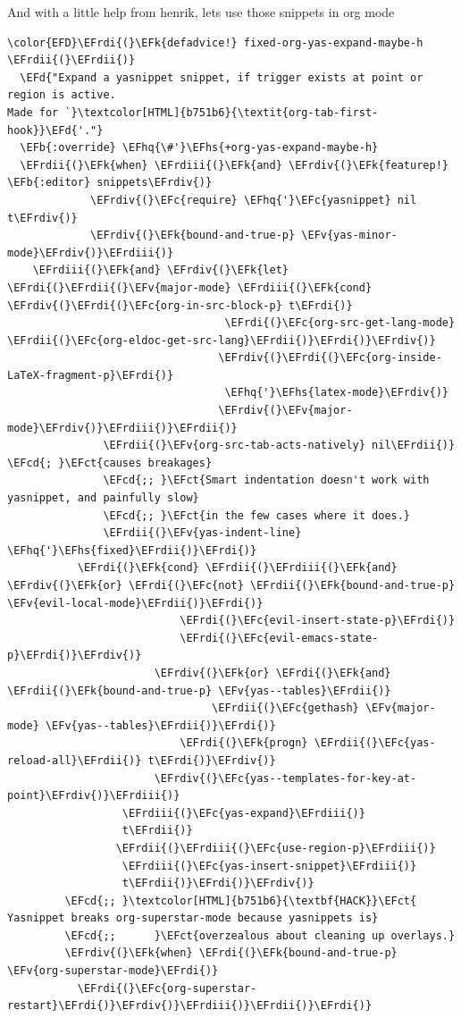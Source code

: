 \documentclass{scrartcl}
\newcommand{\EFk}[1]{\textcolor{EFk}{#1}} %
\newcommand{\EFd}[1]{\textcolor{EFd}{\textit{#1}}} %
\newcommand{\EFb}[1]{\textcolor{EFb}{#1}} %
\newcommand{\EFct}[1]{\textcolor{EFct}{#1}} %
\newcommand{\EFc}[1]{\textcolor{EFc}{#1}} %
\newcommand{\EFv}[1]{\textcolor{EFv}{#1}} %
\newcommand{\EFcd}[1]{\textcolor{EFcd}{#1}} %
\newcommand{\EFhq}[1]{\textcolor{EFhq}{#1}} %
\newcommand{\EFhs}[1]{\textcolor{EFhs}{#1}} %
\newcommand{\EFrdi}[1]{\textcolor{EFrdi}{#1}} %
\newcommand{\EFrdii}[1]{\textcolor{EFrdii}{#1}} %
\newcommand{\EFrdiii}[1]{\textcolor{EFrdiii}{#1}} %
\newcommand{\EFrdiv}[1]{\textcolor{EFrdiv}{#1}} %
\begin{document}
And with a little help from henrik, lets use those snippets in org mode
\begin{Code}
\begin{Verbatim}[]
\color{EFD}\EFrdi{(}\EFk{defadvice!} fixed-org-yas-expand-maybe-h \EFrdii{(}\EFrdii{)}
  \EFd{"Expand a yasnippet snippet, if trigger exists at point or region is active.
Made for `}\textcolor[HTML]{b751b6}{\textit{org-tab-first-hook}}\EFd{'."}
  \EFb{:override} \EFhq{\#'}\EFhs{+org-yas-expand-maybe-h}
  \EFrdii{(}\EFk{when} \EFrdiii{(}\EFk{and} \EFrdiv{(}\EFk{featurep!} \EFb{:editor} snippets\EFrdiv{)}
             \EFrdiv{(}\EFc{require} \EFhq{'}\EFc{yasnippet} nil t\EFrdiv{)}
             \EFrdiv{(}\EFk{bound-and-true-p} \EFv{yas-minor-mode}\EFrdiv{)}\EFrdiii{)}
    \EFrdiii{(}\EFk{and} \EFrdiv{(}\EFk{let} \EFrdi{(}\EFrdii{(}\EFv{major-mode} \EFrdiii{(}\EFk{cond} \EFrdiv{(}\EFrdi{(}\EFc{org-in-src-block-p} t\EFrdi{)}
                                  \EFrdi{(}\EFc{org-src-get-lang-mode} \EFrdii{(}\EFc{org-eldoc-get-src-lang}\EFrdii{)}\EFrdi{)}\EFrdiv{)}
                                 \EFrdiv{(}\EFrdi{(}\EFc{org-inside-LaTeX-fragment-p}\EFrdi{)}
                                  \EFhq{'}\EFhs{latex-mode}\EFrdiv{)}
                                 \EFrdiv{(}\EFv{major-mode}\EFrdiv{)}\EFrdiii{)}\EFrdii{)}
               \EFrdii{(}\EFv{org-src-tab-acts-natively} nil\EFrdii{)} \EFcd{; }\EFct{causes breakages}
               \EFcd{;; }\EFct{Smart indentation doesn't work with yasnippet, and painfully slow}
               \EFcd{;; }\EFct{in the few cases where it does.}
               \EFrdii{(}\EFv{yas-indent-line} \EFhq{'}\EFhs{fixed}\EFrdii{)}\EFrdi{)}
           \EFrdi{(}\EFk{cond} \EFrdii{(}\EFrdiii{(}\EFk{and} \EFrdiv{(}\EFk{or} \EFrdi{(}\EFc{not} \EFrdii{(}\EFk{bound-and-true-p} \EFv{evil-local-mode}\EFrdii{)}\EFrdi{)}
                           \EFrdi{(}\EFc{evil-insert-state-p}\EFrdi{)}
                           \EFrdi{(}\EFc{evil-emacs-state-p}\EFrdi{)}\EFrdiv{)}
                       \EFrdiv{(}\EFk{or} \EFrdi{(}\EFk{and} \EFrdii{(}\EFk{bound-and-true-p} \EFv{yas--tables}\EFrdii{)}
                                \EFrdii{(}\EFc{gethash} \EFv{major-mode} \EFv{yas--tables}\EFrdii{)}\EFrdi{)}
                           \EFrdi{(}\EFk{progn} \EFrdii{(}\EFc{yas-reload-all}\EFrdii{)} t\EFrdi{)}\EFrdiv{)}
                       \EFrdiv{(}\EFc{yas--templates-for-key-at-point}\EFrdiv{)}\EFrdiii{)}
                  \EFrdiii{(}\EFc{yas-expand}\EFrdiii{)}
                  t\EFrdii{)}
                 \EFrdii{(}\EFrdiii{(}\EFc{use-region-p}\EFrdiii{)}
                  \EFrdiii{(}\EFc{yas-insert-snippet}\EFrdiii{)}
                  t\EFrdii{)}\EFrdi{)}\EFrdiv{)}
         \EFcd{;; }\textcolor[HTML]{b751b6}{\textbf{HACK}}\EFct{ Yasnippet breaks org-superstar-mode because yasnippets is}
         \EFcd{;;      }\EFct{overzealous about cleaning up overlays.}
         \EFrdiv{(}\EFk{when} \EFrdi{(}\EFk{bound-and-true-p} \EFv{org-superstar-mode}\EFrdi{)}
           \EFrdi{(}\EFc{org-superstar-restart}\EFrdi{)}\EFrdiv{)}\EFrdiii{)}\EFrdii{)}\EFrdi{)}
\end{Verbatim}
\end{Code}
\end{document}
